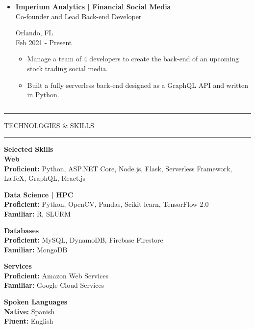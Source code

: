 \documentclass{article}
\newcommand{\makeminipage}[4]{
    \begin{minipage}[c]{.7\linewidth} 
        \flushleft #1 \\ #2
    \end{minipage} \hfill
    \begin{minipage}[c]{.29\linewidth}
        \flushright #3 \\ #4
    \end{minipage}
}
\newcommand{\makesection}[1]{\hrule\vskip1mm\uppercase{#1}\vskip1mm\hrule}
\begin{document}
\begin{minipage}[t]{.69\linewidth}
\begin{itemize}[leftmargin=.35cm]
        \item \makeminipage
            {\textbf{Imperium Analytics | Financial Social Media}}
            {Co-founder and Lead Back-end Developer}
            {Orlando, FL}
            {Feb 2021 - Present}
            \vspace*{-1.5mm}
            \raggedright
            \begin{itemize}[leftmargin=.35cm]
                \item Manage a team of 4 developers to create the back-end of an upcoming stock trading social media.
                \item Built a fully serverless back-end designed as a GraphQL API and written in Python.
            \end{itemize}
    \end{itemize}
\end{minipage}
\begin{minipage}[t]{.01\linewidth}$ $\end{minipage}
\begin{minipage}[t]{.29\linewidth}
    \makesection{Technologies \& Skills}
    \vspace*{3.75mm}
    \raggedright

    \textbf{Selected Skills} \\
    \textbf{Web} \\
    \textbf{Proficient:} Python, ASP.NET Core, Node.js, Flask, Serverless Framework, \LaTeX, GraphQL, React.js
    \vspace*{2mm}

    \textbf{Data Science | HPC} \\
    \textbf{Proficient:} Python, OpenCV, Pandas, Scikit-learn, TensorFlow 2.0 \\
    \textbf{Familiar:} R, SLURM
    \vspace*{2mm}
    
    \textbf{Databases} \\
    \textbf{Proficient:} MySQL, DynamoDB, Firebase Firestore \\
    \textbf{Familiar:} MongoDB
    \vspace*{2mm}

    \textbf{Services} \\
    \textbf{Proficient:} Amazon Web Services \\
    \textbf{Familiar:} Google Cloud Services
    \vspace*{2mm}

    \textbf{Spoken Languages} \\
    \textbf{Native:} Spanish \\
    \textbf{Fluent:} English
\end{minipage}
\vspace*{2.5mm}
\end{document}
